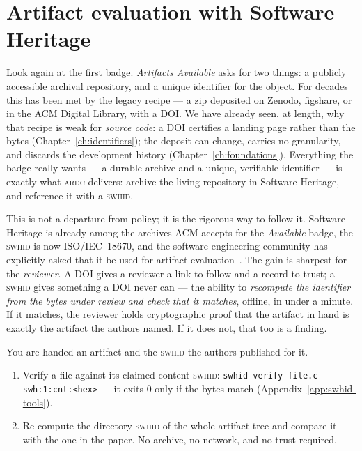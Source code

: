\section{Artifact evaluation with Software Heritage}

Look again at the first badge. \emph{Artifacts Available} asks for two things: a publicly accessible
archival repository, and a unique identifier for the object. For decades this has been met by the
legacy recipe --- a zip deposited on Zenodo, figshare, or in the ACM Digital Library, with a DOI. We
have already seen, at length, why that recipe is weak for \emph{source code}: a DOI certifies a
landing page rather than the bytes (Chapter~\ref{ch:identifiers}); the deposit can change, carries no
granularity, and discards the development history (Chapter~\ref{ch:foundations}). Everything the
badge really wants --- a durable archive and a unique, verifiable identifier --- is exactly what
\textsc{ardc} delivers: archive the living repository in Software Heritage, and reference it with a
\textsc{swhid}.

This is not a departure from policy; it is the rigorous way to follow it. Software Heritage is
already among the archives ACM accepts for the \emph{Available} badge, the \textsc{swhid} is now
ISO/IEC~18670, and the software-engineering community has explicitly asked that it be used for
artifact evaluation~\autocite{sigsoftaecsoftware2022,isoiec18670}. The gain is sharpest for the
\emph{reviewer}. A DOI gives a reviewer a link to follow and a record to trust; a \textsc{swhid}
gives something a DOI never can --- the ability to \emph{recompute the identifier from the bytes
under review and check that it matches}, offline, in under a minute. If it matches, the reviewer
holds cryptographic proof that the artifact in hand is exactly the artifact the authors named. If it
does not, that too is a finding.

\begin{handson}
You are handed an artifact and the \textsc{swhid} the authors published for it.
\begin{enumerate}[nosep,leftmargin=*]
  \item Verify a file against its claimed content \textsc{swhid}: \texttt{swhid verify file.c
        swh:1:cnt:<hex>} --- it exits 0 only if the bytes match (Appendix~\ref{app:swhid-tools}).
  \item Re-compute the directory \textsc{swhid} of the whole artifact tree and compare it with the
        one in the paper. No archive, no network, and no trust required.
\end{enumerate}
\end{handson}

